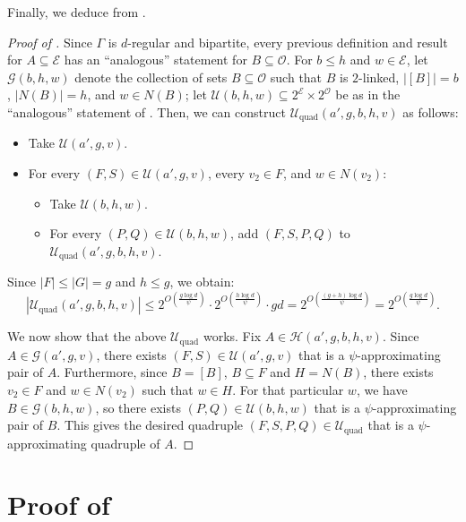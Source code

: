 \documentclass{amsart}
\theoremstyle{definition}
\newcommand{\cO}{\mathcal{O} }
\newcommand{\cE}{\mathcal{E} }
\newcommand{\cH}{\mathcal{H} }
\newcommand{\cU}{\mathcal{U} }
\newcommand{\qd}{\mathrm{quad}}
\newcommand{\0}[0]{\emptyset}
\begin{document}
Finally, we deduce  from .


\begin{proof}[Proof of ] Since $\Gamma$ is $d$-regular and bipartite, every previous definition and result for $A\subseteq \cE$ has an ``analogous'' statement for $B\subseteq\cO$. For $b\leq h$ and $w\in\cE$, let $\mathcal G(b,h,w)$ denote the collection of sets $B \subseteq \cO$ such that $B$ is $2$-linked, $|[B]|=b$, $|N(B)|=h$, and $w \in N(B)$;  let
$\mathcal U(b,h,w)\subseteq 2^{\cE}\times 2^{\cO}$ be as in the ``analogous'' statement of .
Then, we can construct $\cU_\qd(a',g,b,h,v)$ as follows:
\begin{itemize}
    \item Take $\mathcal U(a',g,v)$.
    \item For every $(F,S)\in \mathcal U(a',g,v)$, every $v_2\in F$, and $w\in N(v_2)$:
    \begin{itemize}
        \item Take $\mathcal U(b,h,w)$.
        \item For every $(P,Q)\in \mathcal U(b,h,w)$, add $(F,S,P,Q)$ to $\cU_\qd(a',g,b,h,v)$.
    \end{itemize}
\end{itemize}
Since $|F| \le |G| = g$ and $h \le g$, we obtain:
\[
|\cU_\qd(a',g,b,h,v)| \le 2^{O\left(\frac{g\log d}{\psi}\right)} \cdot 2^{O\left(\frac{h\log d}{\psi}\right)} \cdot gd = 2^{O\left(\frac{(g+h)\log d}{\psi}\right)} = 2^{O\left(\frac{g\log d}{\psi}\right)}.
\]


We now show that the above $\cU_\qd$ works. Fix  $A\in\cH(a',g,b,h,v)$. Since $A\in\mathcal G(a',g,v)$, there exists  $(F,S)\in \mathcal U(a',g,v)$  that is a $\psi$-approximating pair of $A$. Furthermore, since $B=[B]$, $B\subseteq F$ and $H=N(B)$, there exists $v_2\in F$ and $w\in N(v_2)$ such that $w\in H$. For that particular $w$, we have $B\in \mathcal G(b,h,w)$, so there exists   $(P,Q)\in \mathcal U(b,h,w)$ that is a $\psi$-approximating pair of $B$. This gives the desired quadruple $(F,S,P,Q)\in \cU_{\qd}$ that is a $\psi$-approximating quadruple of $A$.
\end{proof}





\section{Proof of }\label{app:2}
\end{document}
